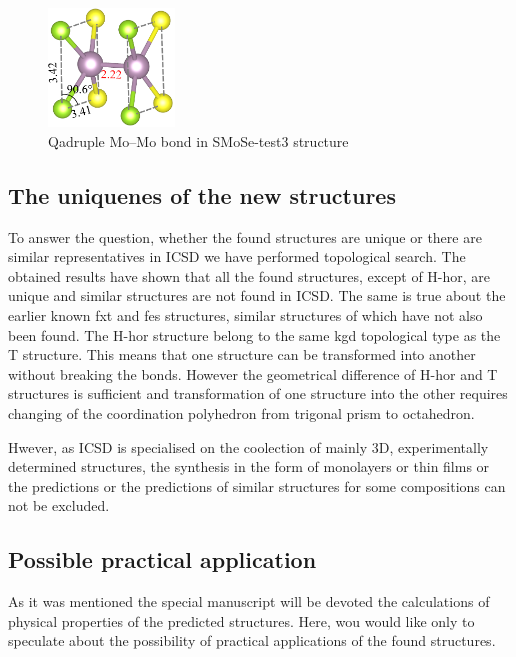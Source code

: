 \documentclass[a4paperm]{article}
\begin{document}
\begin{figure}[H]
	\includegraphics[width=0.3\textwidth]{test3_momo.png}
	\caption{Qadruple Mo--Mo bond in SMoSe-test3 structure}
\label{test3_momo}
\end{figure}








\subsection{The uniquenes of the new structures}

To answer the question, whether the found structures are unique or there are similar representatives in ICSD we have performed topological search.
The obtained results have shown that all the found structures, except of H-hor, are unique and similar structures are not found in ICSD.
The same is true about the earlier known fxt and fes structures, similar structures of which have not also been found. 
The H-hor structure belong to the same kgd topological type as the T structure.
This means that one structure can be transformed into another without breaking the bonds.
However the geometrical difference of H-hor and T structures is sufficient and transformation of one structure into the other requires changing of the coordination polyhedron from trigonal prism to octahedron.

Hwever, as ICSD is specialised on the coolection of mainly 3D, experimentally determined structures, the synthesis in the form of monolayers or thin films or the predictions or the predictions of similar structures for some compositions can not be excluded.



\subsection{Possible practical application}

As it was mentioned the special manuscript will be devoted the calculations of physical properties of the predicted structures.
Here, wou would like only to speculate about the possibility of practical applications of the found structures.
\end{document}
